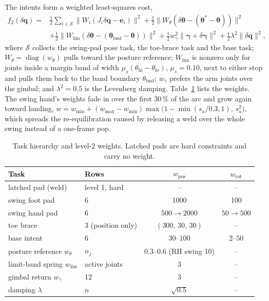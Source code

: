 \documentclass[11pt]{article}
\newcommand{\dq}{\delta\bm q}
\DeclareMathOperator{\diag}{diag}
\begin{document}
The intents form a weighted least-squares cost,
\begin{equation}
\begin{aligned}
  f_2(\dq)={}&\tfrac12\!\!\sum_{i\in\mathcal S}\!\bigl\|W_i(J_i\dq-\bm e_i)\bigr\|^2
  +\tfrac12\bigl\|W_\theta(\delta\bm\theta-(\bm\theta^*-\bm\theta))\bigr\|^2\\
  &+\tfrac12\bigl\|W_{\mathrm{lim}}(\delta\bm\theta-(\bm\theta_{\mathrm{bnd}}-\bm\theta))\bigr\|^2
  +\tfrac12 w_\gamma^2\|\bm\gamma+\delta\bm\gamma\|^2
  +\tfrac12\lambda^2\|\dq\|^2,
\end{aligned}
\label{eq:f2}
\end{equation}
where $\mathcal S$ collects the swing-pad pose task, the toe-brace task and
the base task; $W_\theta=\diag(w_\theta)$ pulls toward the posture reference;
$W_{\mathrm{lim}}$ is nonzero only for joints inside a margin band of width
$\mu_s(\theta_{\mathrm{hi}}-\theta_{\mathrm{lo}})$, $\mu_s=0.10$, next to
either stop and pulls them back to the band boundary $\theta_{\mathrm{bnd}}$;
$w_\gamma$ prefers the arm joints over the gimbal; and $\lambda^2=0.5$ is the
Levenberg damping. Table~\ref{tab:weights} lists the weights. The swing hand's
weights fade in over the first 30\,\% of the arc and grow again toward
landing,
$w=w_{\min}+(w_{\max}-w_{\min})\max\!\bigl(1-\min(s_a/0.3,1),\,s_a^2\bigr)$,
which spreads the re-equilibration caused by releasing a weld over the whole
swing instead of a one-frame pop.

\begin{table}[h]
\centering\small
\begin{tabular}{@{}llcc@{}}
\toprule
Task & Rows & $w_{\mathrm{pos}}$ & $w_{\mathrm{rot}}$ \\
\midrule
latched pad (weld) & level 1, hard & -- & -- \\
swing foot pad & 6 & 1000 & 100 \\
swing hand pad & 6 & $500\to2000$ & $50\to500$ \\
toe brace & 3 (position only) & $(300,\,30,\,30)$ & -- \\
base intent & 6 & $30$--$100$ & $2$--$50$ \\
posture reference $w_\theta$ & $n_j$ & $0.3$--$0.6$ (RH swing 10) & -- \\
limit-band spring $w_{\mathrm{lim}}$ & active joints & 3 & -- \\
gimbal return $w_\gamma$ & 12 & 3 & -- \\
damping $\lambda$ & $n$ & $\sqrt{0.5}$ & -- \\
\bottomrule
\end{tabular}
\caption{Task hierarchy and level-2 weights. Latched pads are hard
constraints and carry no weight.}
\label{tab:weights}
\end{table}
\end{document}
